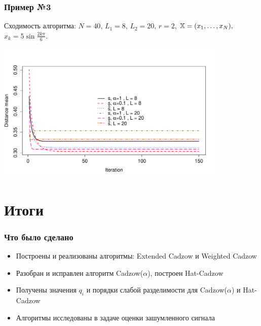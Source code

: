 \documentclass[unicode, notheorems]{beamer}
\begin{document}
\begin{frame}
  \frametitle{Пример №3}
  Сходимость алгоритма: $N = 40$, $L_1 = 8$, $L_2 = 20$, $r = 2$, $\mathbb{X} = (x_{1}, \ldots, x_N),$  $x_k = 5\sin{\frac{2 k \pi}{6}}$.

\includegraphics*[width = 11cm]{cadzowspeed_2.pdf}

\end{frame}
\section{Итоги}

\begin{frame}
  \frametitle{Что было сделано}
  \begin{itemize}
  \item Построены и реализованы алгоритмы: Extended Cadzow и Weighted Cadzow
  \item Разобран и исправлен алгоритм Cadzow($\alpha$), построен Hat-Cadzow
  \item Получены значения $q_i$ и порядки слабой разделимости для Cadzow($\alpha$) и Hat-Cadzow
  \item Алгоритмы исследованы в задаче оценки зашумленного сигнала
  \end{itemize}

\end{frame}
\end{document}
